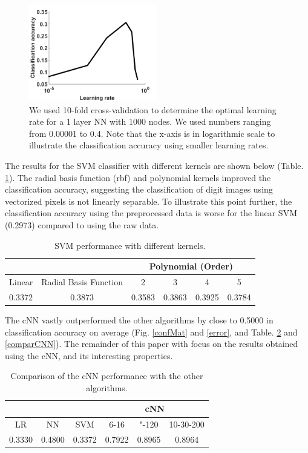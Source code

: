 \documentclass[conference]{IEEEtran}
\begin{document}
\begin{figure}[H]
\centering
\includegraphics[width=0.5\textwidth]{alpha.png}
\caption{\scriptsize We used 10-fold cross-validation to determine the optimal learning rate for a 1 layer NN with 1000 nodes. We used numbers ranging from 0.00001 to 0.4. Note that the x-axis is in logarithmic scale to illustrate the classification accuracy using smaller learning rates.}
\label{alpha}
\end{figure}

The results for the SVM classifier with different kernels are shown below (Table. \ref{svm}). The radial basis function (rbf) and polynomial kernels improved the classification accuracy, suggesting the classification of digit images using vectorized pixels is not linearly separable. To illustrate this point further, the classification accuracy using the preprocessed data is worse for the linear SVM (0.2973) compared to using the raw data.

\begin{table}[htbp]
\footnotesize
\centering
\caption{\footnotesize SVM performance with different kernels.}
\begin{tabular}{|c|c|c|c|c|c|}
\cline{3-6}
\multicolumn{2}{c|}{} & \multicolumn{4}{c|}{Polynomial (Order)} \\
\hline
Linear & Radial Basis Function & 2 & 3 & 4 & 5 \\
\hline
0.3372 & 0.3873 & 0.3583 & 0.3863 & 0.3925 & 0.3784 \\
\hline
\end{tabular}
\label{svm}
\end{table}
\normalsize

The cNN vastly outperformed the other algorithms by close to 0.5000 in classification accuracy on average (Fig. \ref{confMat} and \ref{error}, and Table. \ref{compar} and \ref{comparCNN}). The remainder of this paper with focus on the results obtained using the cNN, and its interesting properties.

\begin{table}[htbp]
\footnotesize
\centering
\caption{\footnotesize Comparison of the cNN performance with the other algorithms.}
\begin{tabular}{|c|c|c|c|c|c|}
\cline{4-6}
\multicolumn{3}{c|}{} & \multicolumn{3}{c|}{cNN} \\
\hline
LR & NN & SVM & 6-16 & "-120 & 10-30-200 \\
\hline
0.3330 & 0.4800 & 0.3372 & 0.7922 & 0.8965 & 0.8964 \\
\hline
\end{tabular}
\label{compar}
\end{table}
\normalsize
\end{document}
